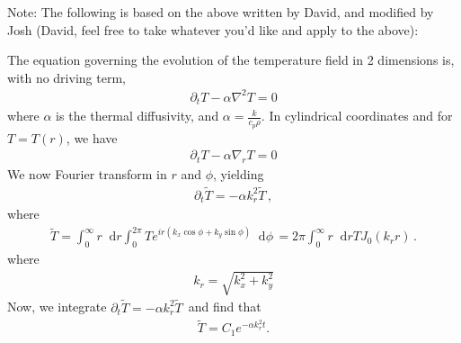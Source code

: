 \documentclass{article}
\newcommand*\diff{\mathop{}\!\mathrm{d}}
\newcommand*\f[2]{\frac{#1}{#2}}
\begin{document}
\pagebreak
Note: The following is based on the above written by David, and modified by Josh (David, feel free to take whatever you'd like and apply to the above):

The equation governing the evolution of the temperature field in 2 dimensions is, with no driving term,
\begin{align}
\partial_t T - \alpha\nabla^2 T = 0
\end{align}
where $\alpha$ is the thermal diffusivity, and $\alpha=\f{k}{c_p\rho}$. In cylindrical coordinates and for $T = T(r)$, we have
\begin{align}
\partial_t T - \alpha\nabla_r T = 0
\end{align}
We now Fourier transform in $r$ and $\phi$, yielding
\begin{align}
\partial_t\tilde T =-\alpha k_r^2 \tilde T\,,
\end{align}
where
\begin{align}
\tilde T =  \int_0^\infty r \diff r\int_{0}^{2\pi} T e^{i r(k_x\cos\phi +k_y\sin\phi)}\diff \phi\, = 2\pi \int_0^\infty r \diff r  T J_0(k_r r)\,.
\end{align}
where
\begin{align}
k_r = \sqrt{k_x^2 +k_y^2}
\end{align}
Now, we integrate $\partial_t\tilde T =-\alpha k_r^2 \tilde T\,$ and find that
\begin{align}
\tilde T = C_1e^{-\alpha k_r^2 t}.
\end{align}
\end{document}
